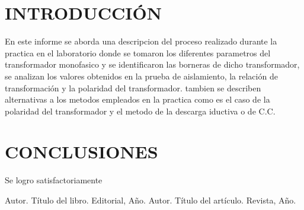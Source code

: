 \documentclass[a4paper,12pt]{article} %
\begin{document}
\section{INTRODUCCIÓN }
En este informe se aborda una descripcion del proceso realizado durante la practica en el laboratorio donde se tomaron los diferentes parametros del transformador monofasico y se identificaron las borneras de dicho transformador, se analizan los valores obtenidos en la prueba de aislamiento, la relación de transformación y la polaridad del transformador. tambien se describen alternativas a los metodos empleados en la practica como es el caso de la polaridad del transformador y el metodo de la descarga iductiva o de C.C.
\section{CONCLUSIONES}
Se logro satisfactoriamente 

\begin{thebibliography}{99}
 Autor. Título del libro. Editorial, Año.
 Autor. Título del artículo. Revista, Año.
\end{thebibliography}
\end{document}
